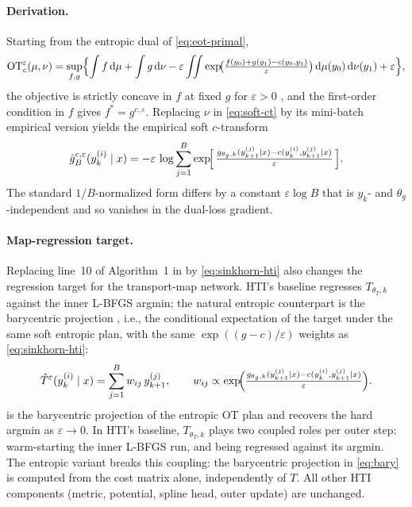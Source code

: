 \documentclass[11pt,a4paper]{article}
\newcommand{\OT}{\mathrm{OT}}
\begin{document}
\paragraph{Derivation.}
Starting from the entropic dual of \cref{eq:eot-primal},
\begin{equation*}
\OT_c^\varepsilon(\mu,\nu)=\sup_{f,g}\Bigl\{\int f\,\mathrm{d}\mu
+\int g\,\mathrm{d}\nu
-\varepsilon\iint \exp\!\bigl(\tfrac{f(y_0)+g(y_1)-c(y_0,y_1)}{\varepsilon}\bigr)\,
\mathrm{d}\mu(y_0)\,\mathrm{d}\nu(y_1)+\varepsilon\Bigr\},
\end{equation*}
the objective is strictly concave in $f$ at fixed $g$ for $\varepsilon>0$
\citep{peyre2019book}, and the first-order condition in $f$
gives $f^{*}=g^{c,\varepsilon}$. Replacing $\nu$ in \cref{eq:soft-ct}
by its mini-batch empirical version yields the empirical soft
$c$-transform
\begin{equation}
\hat g^{c,\varepsilon}_{B}(y_k^{(i)}\mid x)
= -\varepsilon\,\log\sum_{j=1}^{B} \exp\!\Bigl[\,
\tfrac{g_{\theta_g,k}(y_{k+1}^{(j)}\mid x)
-c(y_k^{(i)},y_{k+1}^{(j)}\mid x)}{\varepsilon}\,\Bigr].
\label{eq:sinkhorn-hti}
\end{equation}
The standard $1/B$-normalized form differs by a constant
$\varepsilon\log B$ that is $y_k$- and $\theta_g$-independent and so
vanishes in the dual-loss gradient.

\paragraph{Map-regression target.}
Replacing line~10 of Algorithm~1 in \citet{amad2026hti} by
\cref{eq:sinkhorn-hti} also changes the regression target for the
transport-map network. HTI's baseline regresses $T_{\theta_T,k}$
against the inner L-BFGS argmin; the natural entropic counterpart is
the barycentric projection \citep{pooladian2021entropic}, i.e., the
conditional expectation of the target under the same soft entropic
plan, with the same $\exp((g-c)/\varepsilon)$ weights as
\cref{eq:sinkhorn-hti}:
\begin{equation}
\hat T^\varepsilon(y_k^{(i)}\mid x)
= \sum_{j=1}^{B}w_{ij}\,y_{k+1}^{(j)},\qquad
w_{ij}\propto\exp\!\Bigl(\tfrac{g_{\theta_g,k}(y_{k+1}^{(j)}\mid x)
-c(y_k^{(i)},y_{k+1}^{(j)}\mid x)}{\varepsilon}\Bigr).
\label{eq:bary}
\end{equation}
 is the barycentric projection of the entropic OT plan
\citep{pooladian2021entropic} and recovers the hard argmin as
$\varepsilon\to 0$. In HTI's baseline, $T_{\theta_T,k}$
plays two coupled roles per outer step: warm-starting the inner
L-BFGS run, and being regressed against its argmin. The entropic
variant breaks this coupling: the barycentric projection in
\cref{eq:bary} is computed from the cost matrix alone, independently
of $T$. All other HTI components (metric, potential, spline head, outer
update) are unchanged.
\end{document}

